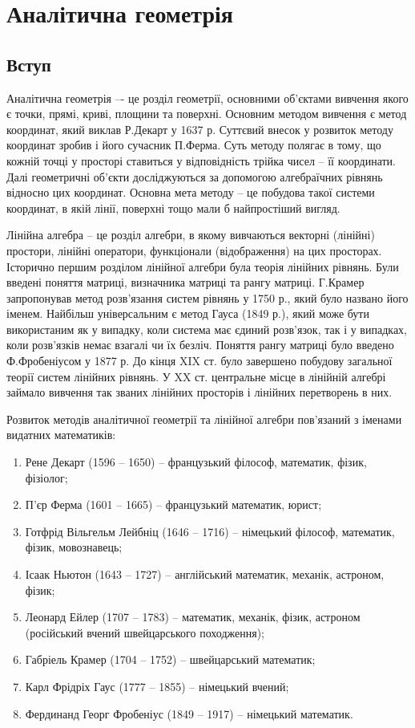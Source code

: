 \chapter{Аналітична геометрія}
\minitoc

\section{Вступ}

Аналітична геометрія –- це розділ геометрії, основними об’єктами вивчення
якого є точки, прямі, криві, площини та поверхні.
Основним методом вивчення є метод координат, який виклав Р.Декарт у
1637 р. Суттєвий внесок у розвиток методу координат зробив і його сучасник
П.Ферма. Суть методу полягає в тому, що кожній точці у просторі ставиться у
відповідність трійка чисел – її координати. Далі геометричні об’єкти
досліджуються за допомогою алгебраїчних рівнянь відносно цих координат.
Основна мета методу – це побудова такої системи координат, в якій лінії,
поверхні тощо мали б найпростіший вигляд.

Лінійна алгебра – це розділ алгебри, в якому вивчаються векторні (лінійні)
простори, лінійні оператори, функціонали (відображення) на цих просторах.
Історично першим розділом лінійної алгебри була теорія лінійних рівнянь.
Були введені поняття матриці, визначника матриці та рангу матриці.
Г.Крамер запропонував метод розв’язання систем рівнянь у 1750 р., який було
названо його іменем.
Найбільш універсальним є метод Гауса (1849 р.), який може бути
використаним як у випадку, коли система має єдиний розв’язок, так і у випадках,
коли розв’язків немає взагалі чи їх безліч. Поняття рангу матриці було введено
Ф.Фробеніусом у 1877 р.
До кінця XIX ст. було завершено побудову загальної теорії систем лінійних
рівнянь. У XX ст. центральне місце в лінійній алгебрі займало вивчення так званих
лінійних просторів і лінійних перетворень в них.

Розвиток методів аналітичної геометрії та лінійної алгебри пов’язаний з
іменами видатних математиків:
\begin{enumerate}
    \item Рене Декарт (1596 – 1650) – французький філософ, математик, фізик, фізіолог;
    \item П’єр Ферма (1601 – 1665) – французький математик, юрист;
    \item Готфрід Вільгельм Лейбніц (1646 – 1716) – німецький філософ, математик, фізик, мовознавець;
    \item Ісаак Ньютон (1643 – 1727) – англійський математик, механік, астроном, фізик;
    \item Леонард Ейлер (1707 – 1783) – математик, механік, фізик, астроном (російський вчений швейцарського походження);
    \item Габріель Крамер (1704 – 1752) – швейцарський математик;
    \item Карл Фрідріх Гаус (1777 – 1855) – німецький вчений;
    \item Фердинанд Георг Фробеніус (1849 – 1917) – німецький математик.
\end{enumerate}

